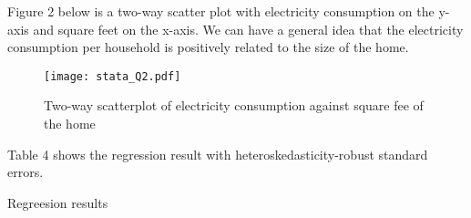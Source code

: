 \documentclass{article}
\begin{document}
Figure 2 below is a two-way scatter plot with electricity consumption on the y-axis and square feet on the x-axis. We can have a general idea that the electricity consumption per household is positively related to the size of the home.

\begin{figure}[hbt!]
    \centering
    \texttt{[image: stata\_Q2.pdf]}
    \caption{Two-way scatterplot of electricity consumption against square fee of the home}
    \label{fig:stata_Q2}
\end{figure}

\hspace{1cm}

Table 4 shows the regression result with heteroskedasticity-robust standard errors.

\begin{table}[hbt!]
    \centering
    
    \caption{Regreesion results}
    \label{tab:stata_Q3}
\end{table}
\end{document}
